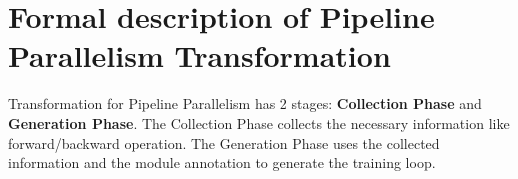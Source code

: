 \documentclass[sigplan, nonacm]{acmart}\settopmatter{printfolios=true,printccs=false,printacmref=false}
\begin{document}
 \section{Formal description of Pipeline Parallelism Transformation}\label{formalpipe}
Transformation for Pipeline Parallelism has 2 stages: \textbf{Collection Phase} and \textbf{Generation Phase}. The Collection Phase collects the necessary information like forward/backward operation. The Generation Phase uses the collected information and the module annotation to generate the training loop.\par
\end{document}
